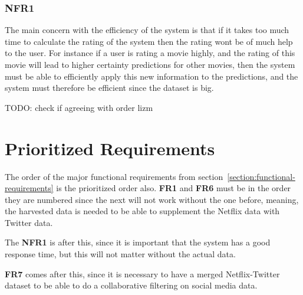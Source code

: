 \subsubsection{NFR1}
The main concern with the efficiency of the system is that if it takes too much time to calculate the rating of the system then the rating wont be of much help to the user. For instance if a user is rating a movie highly, and the rating of this movie will lead to higher certainty predictions for other movies, then the system must be able to efficiently apply this new information to the predictions, and the system must therefore be efficient since the dataset is big.


TODO: check if agreeing with order lizm
\section{Prioritized Requirements}
The order of the major functional requirements from section~\ref{section:functional-requirements} is the prioritized order also. \textbf{FR1} and \textbf{FR6} must be in the order they are numbered since the next will not work without the one before, meaning, the harvested data is needed to be able to supplement the Netflix data with Twitter data.

The \textbf{NFR1} is after this, since it is important that the system has a good response time, but this will not matter without the actual data.

\textbf{FR7} comes after this, since it is necessary to have a merged Netflix-Twitter dataset to be able to do a collaborative filtering on social media data.
